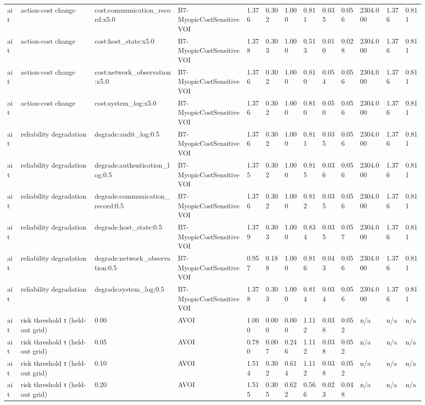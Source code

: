 \begin{table}[!ht]
{\begin{tabular}{lllllllllllll}
ait & action-cost change & cost:communication\_record:x5.0 & B7-MyopicCostSensitiveVOI & 1.376 & 0.302 & 1.000 & 0.811 & 0.035 & 0.056 & 2304.000 & 1.376 & 0.811 \\
ait & action-cost change & cost:host\_state:x5.0 & B7-MyopicCostSensitiveVOI & 1.378 & 0.303 & 1.000 & 0.513 & 0.010 & 0.028 & 2304.000 & 1.376 & 0.811 \\
ait & action-cost change & cost:network\_observation:x5.0 & B7-MyopicCostSensitiveVOI & 1.376 & 0.302 & 1.000 & 0.810 & 0.054 & 0.056 & 2304.000 & 1.376 & 0.811 \\
ait & action-cost change & cost:system\_log:x5.0 & B7-MyopicCostSensitiveVOI & 1.376 & 0.302 & 1.000 & 0.810 & 0.050 & 0.056 & 2304.000 & 1.376 & 0.811 \\
ait & reliability degradation & degrade:audit\_log:0.5 & B7-MyopicCostSensitiveVOI & 1.376 & 0.302 & 1.000 & 0.811 & 0.035 & 0.056 & 2304.000 & 1.376 & 0.811 \\
ait & reliability degradation & degrade:authentication\_log:0.5 & B7-MyopicCostSensitiveVOI & 1.375 & 0.302 & 1.000 & 0.815 & 0.036 & 0.056 & 2304.000 & 1.376 & 0.811 \\
ait & reliability degradation & degrade:communication\_record:0.5 & B7-MyopicCostSensitiveVOI & 1.376 & 0.302 & 1.000 & 0.812 & 0.035 & 0.056 & 2304.000 & 1.376 & 0.811 \\
ait & reliability degradation & degrade:host\_state:0.5 & B7-MyopicCostSensitiveVOI & 1.379 & 0.303 & 1.000 & 0.834 & 0.035 & 0.057 & 2304.000 & 1.376 & 0.811 \\
ait & reliability degradation & degrade:network\_observation:0.5 & B7-MyopicCostSensitiveVOI & 0.957 & 0.188 & 1.000 & 0.816 & 0.043 & 0.056 & 2304.000 & 1.376 & 0.811 \\
ait & reliability degradation & degrade:system\_log:0.5 & B7-MyopicCostSensitiveVOI & 1.378 & 0.303 & 1.000 & 0.814 & 0.034 & 0.056 & 2304.000 & 1.376 & 0.811 \\
ait & risk threshold τ (held-out grid) & 0.00 & AVOI & 1.000 & 0.000 & 0.000 & 1.112 & 0.038 & 0.052 & n/a & n/a & n/a \\
ait & risk threshold τ (held-out grid) & 0.05 & AVOI & 0.780 & 0.007 & 0.246 & 1.112 & 0.038 & 0.052 & n/a & n/a & n/a \\
ait & risk threshold τ (held-out grid) & 0.10 & AVOI & 1.514 & 0.302 & 0.614 & 1.112 & 0.038 & 0.052 & n/a & n/a & n/a \\
ait & risk threshold τ (held-out grid) & 0.20 & AVOI & 1.515 & 0.305 & 0.622 & 0.566 & 0.023 & 0.048 & n/a & n/a & n/a \\

\end{tabular}}
\end{table}
